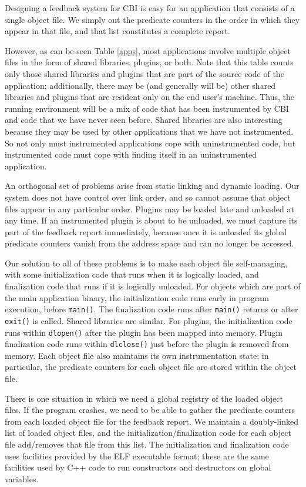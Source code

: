\documentclass[times,10pt,twocolumn]{article}
\begin{document}
Designing a feedback system for CBI is easy for an application that consists of
a single object file.  We simply out the predicate counters in the
order in which they appear in that file, and that list constitutes a complete
report.

However, as can be seen Table \ref{apps}, most applications involve
multiple object files in the form of shared libraries, plugins, or
both.  Note that this table counts only those shared libraries and
plugins that are part of the source code of the application;
additionally, there may be (and generally will be) other shared
libraries and plugins that are resident only on the end user's
machine.  Thus, the running environment will be a mix of code that has
been instrumented by CBI and code that we have never seen before.
Shared libraries are also interesting because they may be used by
other applications that we have not instrumented.  So not only must
instrumented applications cope with uninstrumented code, but
instrumented code must cope with finding itself in an
uninstrumented application.

An orthogonal set of problems arise from static linking and dynamic
loading.  Our system does not have control over link order, and so
cannot assume that object files appear in any particular order.
Plugins may be loaded late and unloaded at any time.  If an
instrumented plugin is about to be unloaded, we must capture its part
of the feedback report immediately, because once it is unloaded its
global predicate counters vanish from the address space and can no
longer be accessed.

Our solution to all of these problems is to make each object file
self-managing, with some initialization code that runs when it is
logically loaded, and finalization code that runs if it is logically
unloaded.  For objects which are part of the main application binary,
the initialization code runs early in program execution, before
\texttt{main()}.  The finalization code runs after \texttt{main()}
returns or after \texttt{exit()} is called.  Shared libraries are
similar.  For plugins, the initialization code runs within
\texttt{dlopen()} after the plugin has been mapped into memory.
Plugin finalization code runs within \texttt{dlclose()} just before
the plugin is removed from memory.  Each object file also maintains its
own instrumentation state; in particular, the predicate counters for each
object file are stored within the object file.

There is one situation in which we need a global registry of the loaded
object files.  If the program crashes, we need to be able to gather
the predicate counters from each loaded object file for the feedback report.
We maintain a doubly-linked list of loaded object files, and the
initialization/finalization code for each object file add/removes that
file from this list. The initialization and finalization code uses
facilities provided by the ELF executable format; these are the same
facilities used by C++ code to run constructors and destructors on
global variables.
\end{document}
